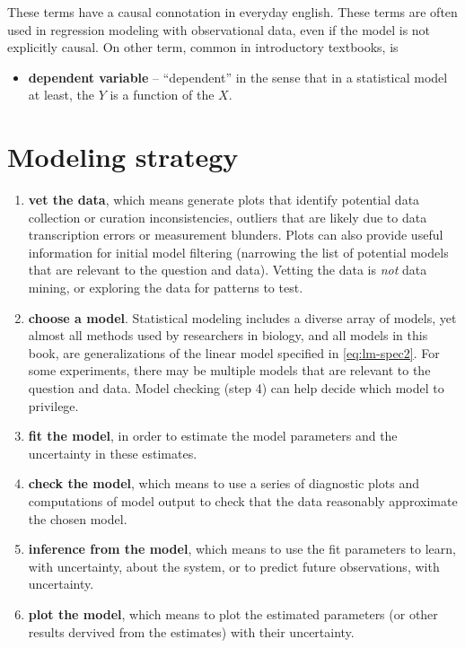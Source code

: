 \documentclass[]{book}
\providecommand{\tightlist}{%
  \setlength{\itemsep}{0pt}\setlength{\parskip}{0pt}}
\begin{document}
These terms have a causal connotation in everyday english. These terms are often used in regression modeling with observational data, even if the model is not explicitly causal. On other term, common in introductory textbooks, is

\begin{itemize}
\tightlist
\item
  \textbf{dependent variable} -- ``dependent'' in the sense that in a statistical model at least, the \(Y\) is a function of the \(X\).
\end{itemize}

\hypertarget{modeling-strategy}{%
\section{Modeling strategy}\label{modeling-strategy}}

\begin{enumerate}
\def\labelenumi{\arabic{enumi}.}
\tightlist
\item
  \textbf{vet the data}, which means generate plots that identify potential data collection or curation inconsistencies, outliers that are likely due to data transcription errors or measurement blunders. Plots can also provide useful information for initial model filtering (narrowing the list of potential models that are relevant to the question and data). Vetting the data is \emph{not} data mining, or exploring the data for patterns to test.
\item
  \textbf{choose a model}. Statistical modeling includes a diverse array of models, yet almost all methods used by researchers in biology, and all models in this book, are generalizations of the linear model specified in \eqref{eq:lm-spec2}. For some experiments, there may be multiple models that are relevant to the question and data. Model checking (step 4) can help decide which model to privilege.
\item
  \textbf{fit the model}, in order to estimate the model parameters and the uncertainty in these estimates.
\item
  \textbf{check the model}, which means to use a series of diagnostic plots and computations of model output to check that the data reasonably approximate the chosen model.
\item
  \textbf{inference from the model}, which means to use the fit parameters to learn, with uncertainty, about the system, or to predict future observations, with uncertainty.
\item
  \textbf{plot the model}, which means to plot the estimated parameters (or other results dervived from the estimates) with their uncertainty.
\end{enumerate}
\end{document}
